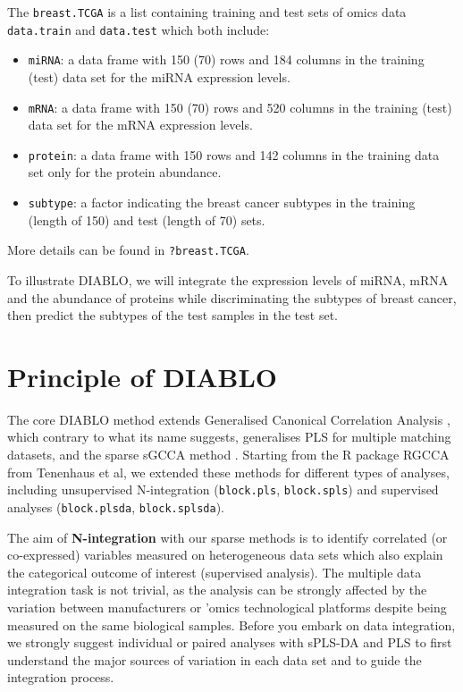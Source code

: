 \documentclass[]{book}
\theoremstyle{definition}
\theoremstyle{definition}
\theoremstyle{definition}
\theoremstyle{remark}
\begin{document}
The \texttt{breast.TCGA} is a list containing training and test sets of
omics data \texttt{data.train} and \texttt{data.test} which both
include:

\begin{itemize}
\item
  \texttt{miRNA}: a data frame with 150 (70) rows and 184 columns in the
  training (test) data set for the miRNA expression levels.
\item
  \texttt{mRNA}: a data frame with 150 (70) rows and 520 columns in the
  training (test) data set for the mRNA expression levels.
\item
  \texttt{protein}: a data frame with 150 rows and 142 columns in the
  training data set only for the protein abundance.
\item
  \texttt{subtype}: a factor indicating the breast cancer subtypes in
  the training (length of 150) and test (length of 70) sets.
\end{itemize}

More details can be found in \texttt{?breast.TCGA}.

To illustrate DIABLO, we will integrate the expression levels of miRNA,
mRNA and the abundance of proteins while discriminating the subtypes of
breast cancer, then predict the subtypes of the test samples in the test
set.

\section{Principle of DIABLO}\label{principle-of-diablo}

The core DIABLO method extends Generalised Canonical Correlation
Analysis \citep{Ten11}, which contrary to what its name suggests,
generalises PLS for multiple matching datasets, and the sparse sGCCA
method \citep{Ten14}. Starting from the R package RGCCA from Tenenhaus
et al, we extended these methods for different types of analyses,
including unsupervised N-integration (\texttt{block.pls},
\texttt{block.spls}) and supervised analyses (\texttt{block.plsda},
\texttt{block.splsda}).

The aim of \textbf{N-integration} with our sparse methods is to identify
correlated (or co-expressed) variables measured on heterogeneous data
sets which also explain the categorical outcome of interest (supervised
analysis). The multiple data integration task is not trivial, as the
analysis can be strongly affected by the variation between manufacturers
or 'omics technological platforms despite being measured on the same
biological samples. Before you embark on data integration, we strongly
suggest individual or paired analyses with sPLS-DA and PLS to first
understand the major sources of variation in each data set and to guide
the integration process.
\end{document}
